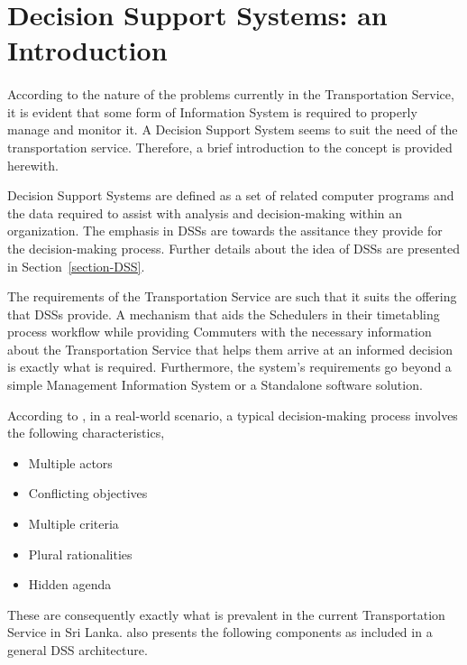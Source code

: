 \documentclass[12pt, oneside]{report}
\begin{document}
\newpage


\section{Decision Support Systems: an Introduction}
\label{section-DSSIntro}

\paragraph{} According to the nature of the problems currently in the Transportation Service, it is evident that some form of Information System is required to properly manage and monitor it. A Decision Support System seems to suit the need of the transportation service. Therefore, a brief introduction to the concept is provided herewith.

Decision Support Systems are defined as a set of related computer programs and the data required to assist with analysis and decision-making within an organization. The emphasis in DSSs are towards the assitance they provide for the decision-making process. Further details about the idea of DSSs are presented in Section~\ref{section-DSS}.

The requirements of the Transportation Service are such that it suits the offering that DSSs provide. A mechanism that aids the Schedulers in their timetabling process workflow while providing Commuters with the necessary information about the Transportation Service that helps them arrive at an informed decision is exactly what is required. Furthermore, the system's requirements go beyond a simple Management Information System or a Standalone software solution. 

According to \citep{Fedra2000}, in a real-world scenario, a typical decision-making process involves the following characteristics,

\begin {itemize}
\item Multiple actors
\item Conflicting objectives
\item Multiple criteria
\item Plural rationalities
\item Hidden agenda
\end {itemize}

These are consequently exactly what is prevalent in the current Transportation Service in Sri Lanka. \citep{Fedra2000} also presents the following components as included in a general DSS architecture.
\end{document}

